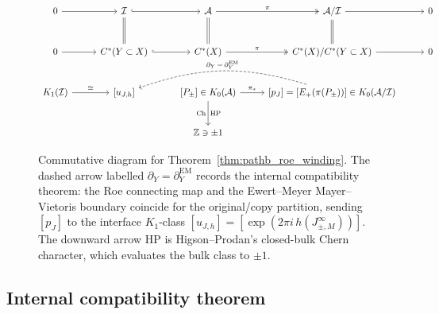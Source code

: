 \documentclass[11pt]{article}
\numberwithin{equation}{section}
\theoremstyle{definition}
\theoremstyle{remark}
\newcommand{\Ch}{\operatorname{Ch}}
\begin{document}
\begin{figure}[H]
\centering
\[
\begin{tikzcd}[row sep=2.6em, column sep=2.6em]
0 \arrow[r] & \mathcal I \arrow[r, hook] \arrow[d, equal] & \mathcal A
  \arrow[r, two heads, "\pi"] \arrow[d, equal] & \mathcal A/\mathcal I \arrow[r]
  \arrow[d, equal] & 0 \\
0 \arrow[r] & C^*(Y\subset X) \arrow[r, hook] & C^*(X)
  \arrow[r, two heads, "\pi"] & C^*(X)/C^*(Y\subset X) \arrow[r] & 0 \\
K_1(\mathcal I) \arrow[r, "\cong"] & {[u_{J,h}]}
  & {[P_\pm]\in K_0(\mathcal A)} \arrow[r, "\pi_*"] \arrow[d, "\Ch"', "\mathrm{HP}"]
  & {[p_J]=[E_+(\pi(P_\pm))]\in K_0(\mathcal A/\mathcal I)}
    \arrow[ll, bend right=18, dashed, "\partial_Y\,=\,\partial^{\mathrm{EM}}_Y"'] \\
  & & \mathbb Z\ni\pm1 &
\end{tikzcd}
\]
\caption{Commutative diagram for Theorem~\ref{thm:pathb_roe_winding}. The dashed arrow labelled
\(\partial_Y=\partial^{\mathrm{EM}}_Y\) records the internal compatibility theorem: the Roe
connecting map and the Ewert--Meyer Mayer--Vietoris boundary coincide for the original/copy
partition, sending \([p_J]\) to the interface \(K_1\)-class
\([u_{J,h}]=[\exp(2\pi i\,h(J_{\pm,M}^\infty))]\). The downward arrow \(\mathrm{HP}\) is
Higson--Prodan's closed-bulk Chern character, which evaluates the bulk class to \(\pm1\).}
\label{fig:pathb_diagram}
\end{figure}

\subsection{Internal compatibility theorem}
\end{document}
